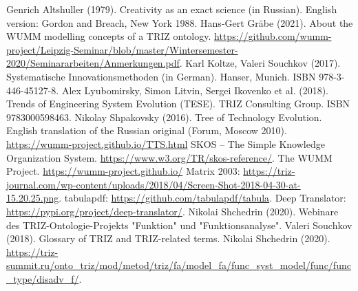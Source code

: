 \documentclass[11pt,a4paper]{article}
\begin{document}
\begin{thebibliography}{xxx}
\raggedright
{} Genrich Altshuller (1979).  Creativity as an exact
  science (in Russian). English version: Gordon and Breach, New York 1988.
 Hans-Gert Gr\"abe (2021). About the WUMM modelling
  concepts of a TRIZ ontology.
  \url{https://github.com/wumm-project/Leipzig-Seminar/blob/master/Wintersemester-2020/Seminararbeiten/Anmerkungen.pdf}.
 Karl Koltze, Valeri Souchkov (2017).  Systematische
  Innovationsmethoden (in German).  Hanser, Munich. ISBN 978-3-446-45127-8.
 Alex Lyubomirsky, Simon Litvin, Sergei Ikovenko et al.
  (2018). Trends of Engineering System Evolution (TESE).  TRIZ Consulting
  Group. ISBN 9783000598463.
 Nikolay Shpakovsky (2016). Tree of Technology
  Evolution. English translation of the Russian original (Forum, Moscow
  2010).\\ \url{https://wumm-project.github.io/TTS.html}
 SKOS -- The Simple Knowledge Organization System.
  \url{https://www.w3.org/TR/skos-reference/}.  
 The WUMM Project. \url{https://wumm-project.github.io/} 
 Matrix 2003:
  \url{https://triz-journal.com/wp-content/uploads/2018/04/Screen-Shot-2018-04-30-at-15.20.25.png}.
 tabulapdf: \url{https://github.com/tabulapdf/tabula}.
 Deep Translator:
  \url{https://pypi.org/project/deep-translator/}.
 Nikolai Shchedrin (2020). Webinare des
  TRIZ-Ontologie-Projekts "Funktion" und "Funktionsanalyse".
 Valeri Souchkov (2018). Glossary of TRIZ and
  TRIZ-related terms.
 Nikolai Shchedrin (2020).
  \url{https://triz-summit.ru/onto_triz/mod/metod/triz/fa/model_fa/func_syst_model/func/func_type/disadv_f/}.
\end{thebibliography}
\end{document}
